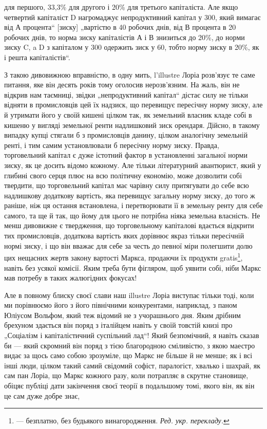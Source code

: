 \parcont{}  %
для першого, 33,3\%  для другого і 20\% для третього капіталіста.
Але якщо четвертий капіталіст D нагромаджує непродуктивний
капітал у 300, який вимагає від А процента“ [зиску]
„вартістю в 40 робочих днів, від В процента в 20 робочих днів,
то норма зиску капіталістів А і В знизиться до 20\%, до норми
зиску C, a D з капіталом у 300 одержить зиск у 60, тобто
норму зиску в 20\%, як і решта капіталістів“.

З такою дивовижною вправністю, в одну мить, l’illustre Лоріа
розв’язує те саме питання, яке він десять років тому оголосив
нерозв’язним. На жаль, він не відкрив нам таємниці, звідки
„непродуктивний капітал“ дістає силу не тільки відняти в промисловців
цей їх надзиск, що перевищує пересічну норму
зиску, але й утримати його у своїй кишені цілком так, як земельний
власник кладе собі в кишеню у вигляді земельної ренти надлишковий
зиск орендаря. Дійсно, в такому випадку купці стягали
б з промисловців данину, цілком аналогічну земельній ренті,
і тим самим установлювали б пересічну норму зиску. Правда,
торговельний капітал є дуже істотний фактор в установленні
загальної норми зиску, як це досить відомо кожному. Але тільки
літературний авантюрист, який у глибині свого серця плює на
всю політичну економію, може дозволити собі твердити, що
торговельний капітал має чарівну силу притягувати до себе
всю надлишкову додаткову вартість, яка перевищує загальну
норму зиску, до того ж раніше, ніж ця остання встановлена,
і перетворювати її в земельну ренту для себе самого, та ще
й так, що йому для цього не потрібна ніяка земельна власність.
Не менш дивовижне є твердження, що торговельному капіталові
вдається відкрити тих промисловців, додаткова вартість яких
дорівнює якраз тільки пересічній нормі зиску, і що він вважає для
себе за честь до певної міри полегшити долю цих нещасних жертв
закону вартості Маркса, продаючи їх продукти gratis\footnote*{
— безплатно, без будьякого винагородження. \emph{Ред. укр. перекладу.}
}, навіть
без усякої комісії. Яким треба бути фігляром, щоб уявити собі,
ніби Маркс мав потребу в таких жалюгідних фокусах!

Але в повному блиску своєї слави наш illustre Лоріа виступає
тільки тоді, коли ми порівнюємо його з його північними
конкурентами, наприклад, з паном Юліусом Вольфом, який теж
відомий не з учорашнього дня. Яким дрібним брехуном здається він
поряд з італійцем навіть у своїй товстій книзі про „Соціалізм
і капіталістичний суспільний лад“! Який безпомічний, я навіть
сказав би — який скромний він поряд з тією благородною сміливістю,
з якою маестро видає за щось само собою зрозуміле,
що Маркс не більше й не менше; як і всі інші люди, цілком
такий самий свідомий софіст, паралогіст, хвалько і шахрай, як
сам пан Лоріа, що Маркс кожного разу, коли потрапляє в
скрутне становище, обіцяє публіці дати закінчення своєї теорії
в подальшому томі, якого він, як він це сам дуже добре знає,
\parbreak{}  %
